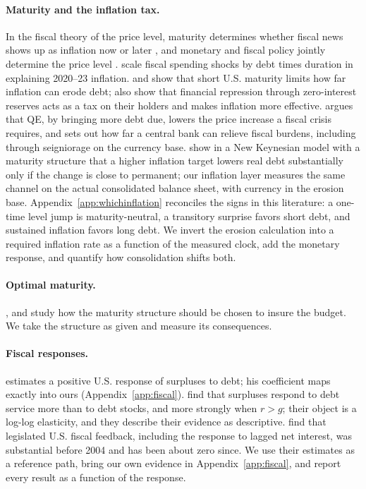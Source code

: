 \paragraph{Maturity and the inflation tax.} In the fiscal theory of the price level, maturity determines whether fiscal news shows up as inflation now or later \citep{cochrane2001,cochrane2022,cochrane2023}, and monetary and fiscal policy jointly determine the price level \citep{sims2013}. \citet{barro2026} scale fiscal spending shocks by debt times duration in explaining 2020--23 inflation. \citet{hilscher2022} and \citet{aizenman2011} show that short U.S. maturity limits how far inflation can erode debt; \citet{hilscher2022} also show that financial repression through zero-interest reserves acts as a tax on their holders and makes inflation more effective. \citet{reis2017a} argues that QE, by bringing more debt due, lowers the price increase a fiscal crisis requires, and \citet{reis2017b} sets out how far a central bank can relieve fiscal burdens, including through seigniorage on the currency base. \citet{krause2016} show in a New Keynesian model with a maturity structure that a higher inflation target lowers real debt substantially only if the change is close to permanent; our inflation layer measures the same channel on the actual consolidated balance sheet, with currency in the erosion base. Appendix~\ref{app:whichinflation} reconciles the signs in this literature: a one-time level jump is maturity-neutral, a transitory surprise favors short debt, and sustained inflation favors long debt. We invert the erosion calculation into a required inflation rate as a function of the measured clock, add the monetary response, and quantify how consolidation shifts both.

\paragraph{Optimal maturity.} \citet{angeletos2002}, \citet{bhandari2017} and \citet{faraglia2019} study how the maturity structure should be chosen to insure the budget. We take the structure as given and measure its consequences.

\paragraph{Fiscal responses.} \citet{bohn1998,bohn2008} estimates a positive U.S. response of surpluses to debt; his coefficient maps exactly into ours (Appendix~\ref{app:fiscal}). \citet{eichengreen2026} find that surpluses respond to debt service more than to debt stocks, and more strongly when $r>g$; their object is a log-log elasticity, and they describe their evidence as descriptive. \citet{auerbach2024} find that legislated U.S. fiscal feedback, including the response to lagged net interest, was substantial before 2004 and has been about zero since. We use their estimates as a reference path, bring our own evidence in Appendix~\ref{app:fiscal}, and report every result as a function of the response.
